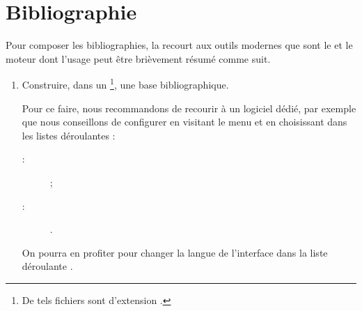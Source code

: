 \documentclass[french,nolocaltoc]{nwejmart}
\newtheorem[style=definition]{fait}
\newtheorem[title=contraventionnalisation]{ctrv}
\newtheorem[title-plural=anneaux]{anneau}
\newtheorem[title-plural=idéaux]{idéal}
\begin{document}
\section{Bibliographie}
\label{sec-bibliographie}

Pour composer les bibliographies, la \nwejmauthorcl{} recourt aux outils
modernes que sont le  et le moteur  dont
l'usage peut être brièvement résumé comme suit\autocite[Pour plus de détails,
cf. par exemple][en français]{Bitouze}.
\begin{enumerate}
\item Construire, dans un \footnote{De tels
    fichiers sont d'extension .}, une base bibliographique.

  Pour ce faire, nous recommandons de recourir à un logiciel dédié, par exemple
  \href{http://jabref.sourceforge.net/}{} que nous conseillons
  de configurer en visitant le menu
   et en choisissant dans les listes
  déroulantes :
  \begin{description}
  \item[ :]  ;
  \item[ :] .
  \end{description}
  On pourra en profiter pour changer la langue de l'interface dans la liste
  déroulante .


\end{enumerate}
\end{document}
